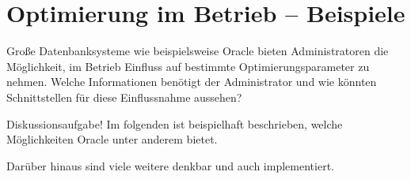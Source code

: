 \section{Optimierung im Betrieb -- Beispiele}

Große Datenbanksysteme wie beispielsweise Oracle bieten Administratoren die Möglichkeit,
im Betrieb Einfluss auf bestimmte Optimierungsparameter zu nehmen.
Welche Informationen benötigt der Administrator und wie könnten Schnittstellen für diese Einflussnahme aussehen?

\begin{note}
Diskussionsaufgabe! Im folgenden ist beispielhaft beschrieben,
welche Möglichkeiten Oracle unter anderem bietet.

Darüber hinaus sind viele weitere denkbar und auch implementiert.
\end{note}

